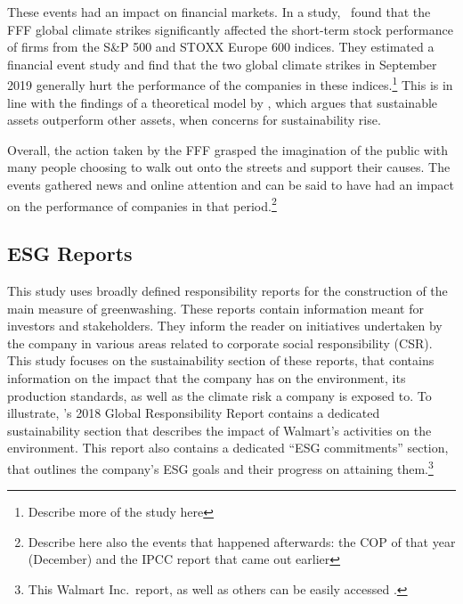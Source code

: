 \documentclass[12pt]{article}
\begin{document}
These events had an impact on financial markets. In a \citeyear{schusterStockPriceReactions2023} study,~\citeauthor{schusterStockPriceReactions2023} found that the FFF global climate strikes significantly affected the short-term stock performance of firms from the S\&P 500 and STOXX Europe 600 indices. They estimated a financial event study and find that the two global climate strikes in September 2019 generally hurt the performance of the companies in these indices.\footnote{Describe more of the study here} This is in line with the findings of a theoretical model by \textcite{pastorSustainableInvestingEquilibrium2021}, which argues that sustainable assets outperform other assets, when concerns for sustainability rise.

Overall, the action taken by the FFF grasped the imagination of the public with many people choosing to walk out onto the streets and support their causes. The events gathered news and online attention and can be said to have had an impact on the performance of companies in that period.\footnote{Describe here also the events that happened afterwards: the COP of that year (December) and the IPCC report that came out earlier}

\subsection{ESG Reports}

This study uses broadly defined responsibility reports for the construction of the main measure of greenwashing. These reports contain information meant for investors and stakeholders. They inform the reader on initiatives undertaken by the company in various areas related to corporate social responsibility (CSR). This study focuses on the sustainability section of these reports, that contains information on the impact that the company has on the environment, its production standards, as well as the climate risk a company is exposed to. To illustrate, \citeauthor{walmart2018csr}'s 2018 Global Responsibility Report contains a dedicated sustainability section that describes the impact of Walmart's activities on the environment. This report also contains a dedicated ``ESG commitments'' section, that outlines the company's ESG goals and their progress on attaining them.\footnote{This Walmart Inc.~report, as well as others can be easily accessed \href{https://www.responsibilityreports.com/Company/walmart-inc}{}.}
\end{document}
